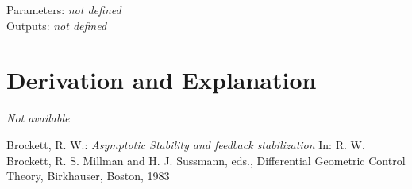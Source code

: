 \documentclass[10pt,a4paper]{article}
\begin{document}
	\noindent
	Parameters: \textit{\textlangle not defined\textrangle} 
	\\
	Outputs: \textit{\textlangle not defined\textrangle} 
	
	
	\section{Derivation and Explanation} %
	
	\textit{Not available}
	
	
	\begin{thebibliography}{10}		
		Brockett, R. W.: 
		\textit{Asymptotic Stability and feedback stabilization} In: R. W. Brockett, R. S. 		Millman and H. J. Sussmann, eds., Differential Geometric Control Theory, 					Birkhauser, Boston, 1983
	\end{thebibliography}
\end{document}
